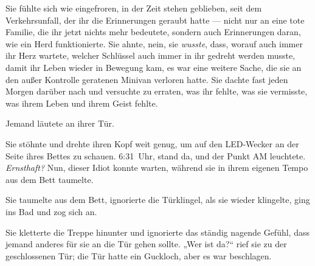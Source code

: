 Sie fühlte sich wie eingefroren, in der Zeit stehen geblieben, seit dem Verkehrsunfall, der ihr die Erinnerungen geraubt hatte — nicht nur an eine tote Familie, die ihr jetzt nichts mehr bedeutete, sondern auch Erinnerungen daran, wie ein Herd funktionierte. Sie ahnte, nein, sie \emph{wusste}, dass, worauf auch immer ihr Herz wartete, welcher Schlüssel auch immer in ihr gedreht werden musste, damit ihr Leben wieder in Bewegung kam, es war eine weitere Sache, die sie an den außer Kontrolle geratenen Minivan verloren hatte. Sie dachte fast jeden Morgen darüber nach und versuchte zu erraten, was ihr fehlte, was sie vermisste, was ihrem Leben und ihrem Geist fehlte.

Jemand läutete an ihrer Tür.

Sie stöhnte und drehte ihren Kopf weit genug, um auf den LED-Wecker an der Seite ihres Bettes zu schauen. 6:31~Uhr, stand da, und der Punkt AM leuchtete. \emph{Ernsthaft?} Nun, dieser Idiot konnte warten, während sie in ihrem eigenen Tempo aus dem Bett taumelte.

Sie taumelte aus dem Bett, ignorierte die Türklingel, als sie wieder klingelte, ging ins Bad und zog sich an.

Sie kletterte die Treppe hinunter und ignorierte das ständig nagende Gefühl, dass jemand anderes für sie an die Tür gehen sollte.
„Wer ist da?“ rief sie zu der geschlossenen Tür; die Tür hatte ein Guckloch, aber es war beschlagen.

